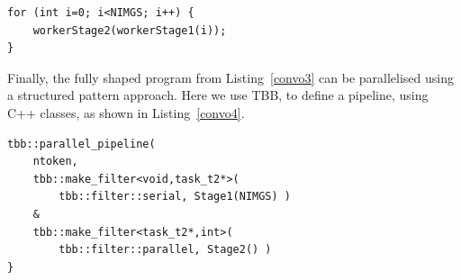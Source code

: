 \begin{lstlisting}[label=convo3,caption={Convolution Shaped},frame=single]
for (int i=0; i<NIMGS; i++) {
	workerStage2(workerStage1(i));
}
\end{lstlisting}

\noindent
Finally, the fully shaped program from Listing~\ref{convo3} can be parallelised using a structured pattern approach. Here we use TBB, to define a pipeline, using C++ classes, as shown in Listing~\ref{convo4}.


\begin{lstlisting}[label=convo4, caption={Convolution Restored with TBB},frame=single]
tbb::parallel_pipeline(
	ntoken,
	tbb::make_filter<void,task_t2*>(
		tbb::filter::serial, Stage1(NIMGS) )
	&
	tbb::make_filter<task_t2*,int>(
		tbb::filter::parallel, Stage2() )
}
\end{lstlisting}


